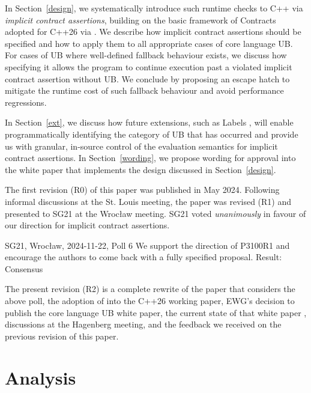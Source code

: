 In Section~\ref{design}, we systematically introduce such runtime checks to C++ via  \emph{implicit contract assertions}, building on the basic framework of Contracts adopted for C++26 via \cite{P2900R14}. We describe how implicit contract assertions should be specified and how to apply them to all appropriate cases of core language UB. For cases of UB where well-defined fallback behaviour exists, we discuss how specifying it allows the program to continue execution past a violated implicit contract assertion without UB. We conclude by proposing an escape hatch to mitigate the runtime cost of such fallback behaviour and avoid performance regressions.

In Section~\ref{ext}, we discuss how future extensions, such as Labels \cite{P3400R1},
will enable programmatically identifying the category of UB that has occurred and provide us with granular, in-source control of the evaluation semantics for implicit contract assertions. In Section~\ref{wording}, we propose wording for approval into the white paper that implements the design discussed in Section~\ref{design}.

The first revision (R0) of this paper was published in May 2024. Following informal discussions at the St. Louis meeting, the paper was revised (R1) and presented to SG21 at the Wroc{\l}aw meeting. SG21 voted \emph{unanimously} in favour of our direction for implicit contract assertions.
\vspace{2mm}
\begin{wgpoll}{{SG21, Wroc{\l}aw, 2024-11-22, Poll 6}}
We support the direction of P3100R1 and encourage the authors to come back with a fully specified proposal.
Result: Consensus
\end{wgpoll}
\vspace{2mm}

The present revision (R2) is a complete rewrite of the paper that considers the above poll, the adoption of \cite{P2900R14} into the C++26 working paper, EWG's decision to publish the core language UB white paper, the current state of that white paper \cite{P3656R1}, discussions at the Hagenberg meeting, and the feedback we received on the previous revision of this paper.

\section{Analysis}
\label{ub}

